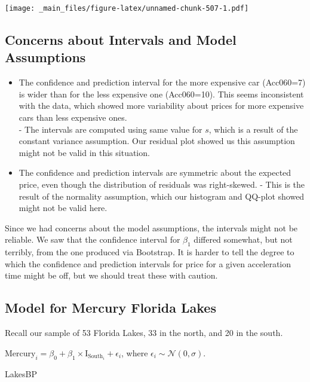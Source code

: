 \documentclass[]{book}
\newenvironment{Shaded}{\begin{snugshade}}{\end{snugshade}}
\newcommand{\NormalTok}[1]{#1}
\begin{document}
\texttt{[image: \_main\_files/figure-latex/unnamed-chunk-507-1.pdf]}

\subsection{Concerns about Intervals and Model
Assumptions}\label{concerns-about-intervals-and-model-assumptions}

\begin{itemize}
\item
  The confidence and prediction interval for the more expensive car
  (Acc060=7) is wider than for the less expensive one (Acc060=10). This
  seems inconsistent with the data, which showed more variability about
  prices for more expensive cars than less expensive ones.\\
  - The intervals are computed using same value for \(s\), which is a
  result of the constant variance assumption. Our residual plot showed
  us this assumption might not be valid in this situation.
\item
  The confidence and prediction intervals are symmetric about the
  expected price, even though the distribution of residuals was
  right-skewed. - This is the result of the normality assumption, which
  our histogram and QQ-plot showed might not be valid here.
\end{itemize}

Since we had concerns about the model assumptions, the intervals might
not be reliable. We saw that the confidence interval for \(\beta_1\)
differed somewhat, but not terribly, from the one produced via
Bootstrap. It is harder to tell the degree to which the confidence and
prediction intervals for price for a given acceleration time might be
off, but we should treat these with caution.

\subsection{Model for Mercury Florida
Lakes}\label{model-for-mercury-florida-lakes}

Recall our sample of 53 Florida Lakes, 33 in the north, and 20 in the
south.

\(\text{Mercury}_i = \beta_0 + \beta_1\times\text{I}_{\text{South}_i} + \epsilon_i\),
where \(\epsilon_i\sim\mathcal{N}(0, \sigma)\).

\begin{Shaded}
\begin{Highlighting}[]
\NormalTok{LakesBP}
\end{Highlighting}
\end{Shaded}
\end{document}
